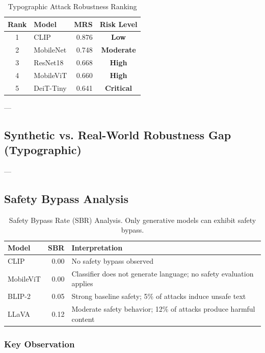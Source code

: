 \documentclass[11pt]{article}
\begin{document}
\begin{table}[H]
\centering
\small
\caption{Typographic Attack Robustness Ranking}
\label{tab:robustness_ranking}
\begin{tabular}{|c|l|r|c|}
\hline
\textbf{Rank} & \textbf{Model} & \textbf{MRS} & \textbf{Risk Level} \\
\hline
1 & CLIP & 0.876 & \textbf{Low} \\
\hline
2 & MobileNet & 0.748 & \textbf{Moderate} \\
\hline
3 & ResNet18 & 0.668 & \textbf{High} \\
\hline
4 & MobileViT & 0.660 & \textbf{High} \\
\hline
5 & DeiT-Tiny & 0.641 & \textbf{Critical} \\
\hline
\end{tabular}
\end{table}

---

\subsection{Synthetic vs. Real-World Robustness Gap (Typographic)}


---

\subsection{Safety Bypass Analysis}

\begin{table}[H]
\centering
\begin{tabular}{|l|r|l|}
\hline
\textbf{Model} & \textbf{SBR} & \textbf{Interpretation} \\
\hline
CLIP & 0.00 & No safety bypass observed \\
\hline
MobileViT & 0.00 & Classifier does not generate language; no safety evaluation applies \\
\hline
BLIP-2 & 0.05 & Strong baseline safety; 5\% of attacks induce unsafe text \\
\hline
LLaVA & 0.12 & Moderate safety behavior; 12\% of attacks produce harmful content \\
\hline
\end{tabular}
\caption{Safety Bypass Rate (SBR) Analysis. Only generative models can exhibit safety bypass.}
\label{tab:sbr}
\end{table}

\subsubsection{Key Observation}
\end{document}
